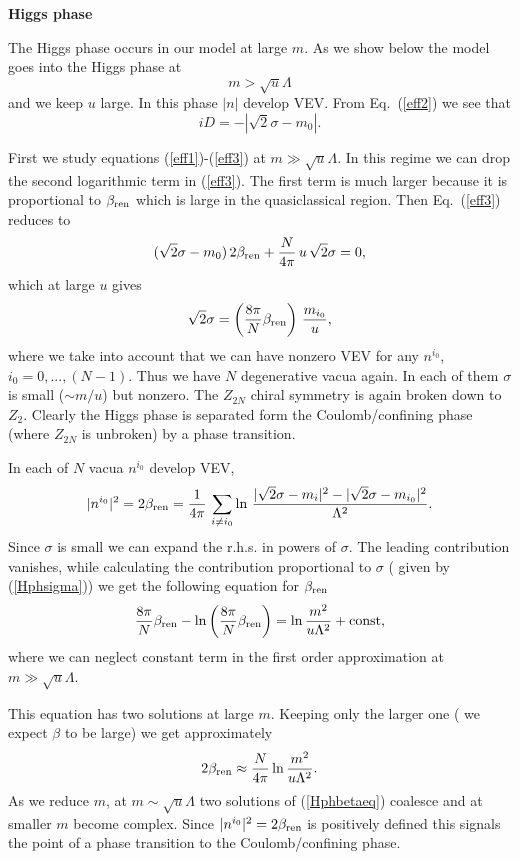\documentclass[epsfig,12pt]{article}
\def\beq{\begin{equation}}
\def\eeq{\end{equation}}
\def\beq{\begin{equation}}
\def\eeq{\end{equation}}
\begin{document}
{\begin{center}
{\bf Higgs phase}
\end{center}

The Higgs phase occurs in our model at large $m$. As we show below the model goes into the Higgs phase at
\beq
m>\sqrt{u}\Lambda
\label{Hphmass}
\eeq
and we keep $u$ large.
In this phase $|n|$ develop VEV. From Eq.~(\ref{eff2}) we see that
\beq
iD=-|\sqrt{2}\sigma -m_0|.
\label{HphD}
\eeq

First we  study equations (\ref{eff1})-(\ref{eff3}) at $m\gg \sqrt{u}\Lambda$. 
In this regime we can drop the second logarithmic term in (\ref{eff3}). The first
term is much larger because it is   proportional to $\beta_{\rm ren}$ which is large in the quasiclassical region. Then Eq.~(\ref{eff3}) reduces to
\beq
(\sqrt{2}\sigma -m_0)\,2\beta_{\rm ren}+\frac{N}{4\pi}\,u\,\sqrt{2}\sigma =0,
\eeq
which at large $u$  gives
\beq
\sqrt{2}\sigma=\left(\frac{8\pi}{N}\beta_{\rm ren}\right)\,\frac{m_{i_{0}}}{u},
\label{Hphsigma}
\eeq
where we take into account that we can have nonzero VEV for any $n^{i_0}$, $i_0=0,...,(N-1)$.
Thus we have $N$ degenerative vacua again. In each of them $\sigma$ is small ($\sim m/u$) but
nonzero. The $Z_{2N}$ chiral symmetry is again broken down to $Z_2$. Clearly the 
Higgs phase is separated form the Coulomb/confining phase (where $Z_{2N}$ is unbroken) by
a phase transition.

In each of $N$ vacua $n^{i_0}$ develop VEV,
\beq
|n^{i_0}|^2=2\beta_{\rm ren}=\frac{1}{4\pi}\, 
\sum_{i\neq i_0}\ln\, {\frac{|\sqrt{2}\sigma-m_i|^2 -|\sqrt{2}\sigma-m_{i_0}|^2}{\Lambda^2}}.
\label{Hphn}
\eeq
Since $\sigma$ is small we can expand the r.h.s. in powers of $\sigma$. The leading contribution
vanishes, while calculating the contribution proportional to $\sigma$ ( given by (\ref{Hphsigma})) we
get the following equation for $\beta_{\rm ren}$
\beq
\frac{8\pi}{N}\beta_{\rm ren}- \ln{\left(\frac{8\pi}{N}\beta_{\rm ren}\right)}=\ln{\frac{m^2}{u\Lambda^2}} +
{\rm const},
\label{Hphbetaeq}
\eeq
where we can neglect constant term in the first order approximation at $m\gg \sqrt{u}\Lambda$.

This equation has two solutions at large $m$. Keeping only the larger one ( we expect $\beta$ to be large)
we get approximately
\beq
2\beta_{\rm ren}\approx \frac{N}{4\pi}\ln{\frac{m^2}{u\Lambda^2}}. 
\label{Hphbeta}
\eeq
As we reduce $m$, at $m\sim \sqrt{u}\Lambda$ two solutions of (\ref{Hphbetaeq}) coalesce and 
at smaller $m$ become complex. Since $|n^{i_0}|^2=2\beta_{\rm ren}$ is positively defined this
signals the point of a phase transition to the Coulomb/confining phase.

}
\end{document}
